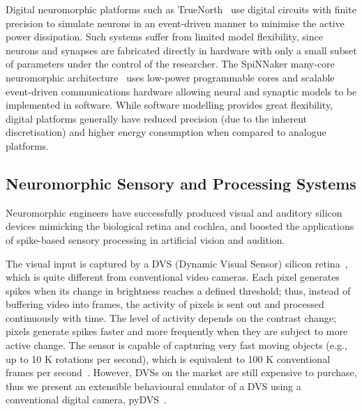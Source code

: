 Digital neuromorphic platforms such as TrueNorth~\citep{merolla2014million} use digital circuits with finite precision to simulate neurons in an event-driven manner to minimise the active power dissipation.
Such systems suffer from limited model flexibility, since neurons and synapses are fabricated directly in hardware with only a small subset of parameters under the control of the researcher.
The SpiNNaker many-core neuromorphic architecture~\citep{furber2014spinnaker} uses low-power programmable cores and scalable event-driven communications hardware allowing neural and synaptic models to be implemented in software.
While software modelling provides great flexibility, digital platforms generally have reduced precision (due to the inherent discretisation) and higher energy consumption when compared to analogue platforms.

\subsection{Neuromorphic Sensory and Processing Systems}
\label{sec:morph}
Neuromorphic engineers have successfully produced visual and auditory silicon devices mimicking the biological retina and cochlea, and boosted the applications of spike-based sensory processing in artificial vision and audition.

The visual input is captured by a DVS (Dynamic Visual Sensor) silicon retina~\citep{delbruck2008frame,serrano2013128}, which is quite different from conventional video cameras.
Each pixel generates spikes when its change in brightness reaches a defined threshold;
thus, instead of buffering video into frames, the activity of pixels is sent out and processed continuously with time.
The level of activity depends on the contrast change; pixels generate spikes faster and more frequently when they are subject to more active change.
The sensor is capable of capturing very fast moving objects (e.g., up to 10 K rotations per second), which is equivalent to 100 K conventional frames per second~\citep{lenero20113}.
However, DVSs on the market are still expensive to purchase, thus we present an extensible behavioural emulator of a DVS using a conventional digital camera, pyDVS~\citep{7850249}.

